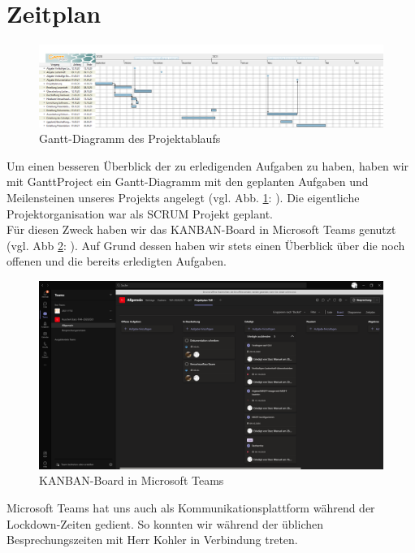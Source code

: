 \section{Zeitplan}\label{zeitplan}
\begin{figure}[H]
	\includegraphics[width=1\textwidth]{img/TAR_FKMS_20202021.png}
	\caption[Gantt-Diagramm des Projektablaufs]{Gantt-Diagramm des Projektablaufs}
 	\label{fig:gantt-diagramm}
\end{figure}
Um einen besseren Überblick der zu erledigenden Aufgaben zu haben, haben wir mit GanttProject ein Gantt-Diagramm mit den geplanten Aufgaben und Meilensteinen unseres Projekts angelegt (vgl. Abb. \ref{fig:gantt-diagramm}: ).
Die eigentliche Projektorganisation war als SCRUM Projekt geplant. \\
\noindent Für diesen Zweck haben wir das KANBAN-Board in Microsoft Teams genutzt (vgl. Abb \ref{fig:kanban}: ).
Auf Grund dessen haben wir stets einen Überblick über die noch offenen und die bereits erledigten Aufgaben.\\
\begin{figure}[H]
    \includegraphics[width=1\textwidth]{img/teams_kanban.png}
    \caption[KANBAN-Board in Microsoft Teams]{KANBAN-Board in Microsoft Teams}
    \label{fig:kanban}
\end{figure}
\noindent Microsoft Teams hat uns auch als Kommunikationsplattform während der Lockdown-Zeiten gedient. 
So konnten wir während der üblichen Besprechungszeiten mit Herr Kohler in Verbindung treten.
\newpage